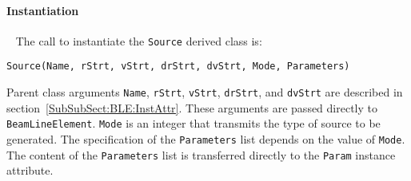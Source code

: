 \paragraph{Instantiation} ~\newline
\noindent
The call to instantiate the \texttt{Source} derived class is:
\begin{center}
  \texttt{Source(Name, rStrt, vStrt, drStrt, dvStrt,
          Mode, Parameters)}
\end{center}
Parent class arguments \texttt{Name}, \texttt{rStrt}, \texttt{vStrt},
\texttt{drStrt}, and \texttt{dvStrt} are described in
section~\ref{SubSubSect:BLE:InstAttr}.
These arguments are passed directly to \texttt{BeamLineElement}.
\texttt{Mode} is an integer that transmits the type of source to be
generated.
The specification of the \texttt{Parameters} list depends on the value
of \texttt{Mode}.
The content of the \texttt{Parameters} list is transferred directly to
the \texttt{Param} instance attribute.

